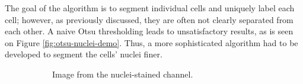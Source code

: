 \documentclass[
  digital,     %
  oneside,     %
  nosansbold,  %
  nocolorbold, %
  lof,         %
  lot,         %
]{fithesis4}
\begin{document}
The goal of the algorithm is to segment individual cells and uniquely label each
cell; however, as previously discussed, they are often not clearly separated
from each other. A naive Otsu thresholding leads to unsatisfactory results, as is
seen on Figure \ref{fig:otsu-nuclei-demo}. Thus, a more sophisticated algorithm
had to be developed to segment the cells' nuclei finer.
\begin{figure}
    \begin{subfigure}[t]{0.45\textwidth}
        \centering
        \caption{Image from the nuclei-stained channel.}
    \end{subfigure}
    \begin{subfigure}[t]{0.45\textwidth}
        \centering

\end{subfigure}
\end{figure}
\end{document}
